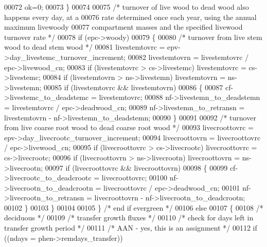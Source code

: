 \begin{DoxyCode}
00072             ok=0;
00073         \}
00074         
00075         \textcolor{comment}{/* turnover of live wood to dead wood also happens every day, at a}
00076 \textcolor{comment}{        rate determined once each year, using the annual maximum livewoody}
00077 \textcolor{comment}{        compartment masses and the specified livewood turnover rate */}
00078         \textcolor{keywordflow}{if} (epc->woody)
00079         \{
00080             \textcolor{comment}{/* turnover from live stem wood to dead stem wood */}
00081             livestemtovrc = epv->day\_livestemc\_turnover\_increment;
00082             livestemtovrn = livestemtovrc / epc->livewood\_cn;
00083             \textcolor{keywordflow}{if} (livestemtovrc > cs->livestemc) livestemtovrc = cs->livestemc;
00084             \textcolor{keywordflow}{if} (livestemtovrn > ns->livestemn) livestemtovrn = ns->livestemn;
00085             \textcolor{keywordflow}{if} (livestemtovrc && livestemtovrn)
00086             \{
00087                 cf->livestemc\_to\_deadstemc = livestemtovrc;
00088                 nf->livestemn\_to\_deadstemn = livestemtovrc / epc->deadwood\_cn;
00089                 nf->livestemn\_to\_retransn = livestemtovrn - nf->livestemn\_to\_deadstemn;
00090             \}
00091 
00092             \textcolor{comment}{/* turnover from live coarse root wood to dead coarse root wood */}
00093             livecroottovrc = epv->day\_livecrootc\_turnover\_increment;
00094             livecroottovrn = livecroottovrc / epc->livewood\_cn;
00095             \textcolor{keywordflow}{if} (livecroottovrc > cs->livecrootc) livecroottovrc = cs->livecrootc;
00096             \textcolor{keywordflow}{if} (livecroottovrn > ns->livecrootn) livecroottovrn = ns->livecrootn;
00097             \textcolor{keywordflow}{if} (livecroottovrc && livecroottovrn)
00098             \{
00099                 cf->livecrootc\_to\_deadcrootc = livecroottovrc;
00100                 nf->livecrootn\_to\_deadcrootn = livecroottovrc / epc->deadwood\_cn;
00101                 nf->livecrootn\_to\_retransn = livecroottovrn - nf->livecrootn\_to\_deadcrootn;
00102             \}
00103         \}
00104         
00105     \} \textcolor{comment}{/* end if evergreen */}
00106     \textcolor{keywordflow}{else}
00107     \{
00108         \textcolor{comment}{/* deciduous */}
00109         \textcolor{comment}{/* transfer growth fluxes */}
00110         \textcolor{comment}{/* check for days left in transfer growth period */}
00111         \textcolor{comment}{/* AAN - yes, this is an assignment */}
00112         \textcolor{keywordflow}{if} ((ndays = phen->remdays\_transfer))

\end{DoxyCode}
